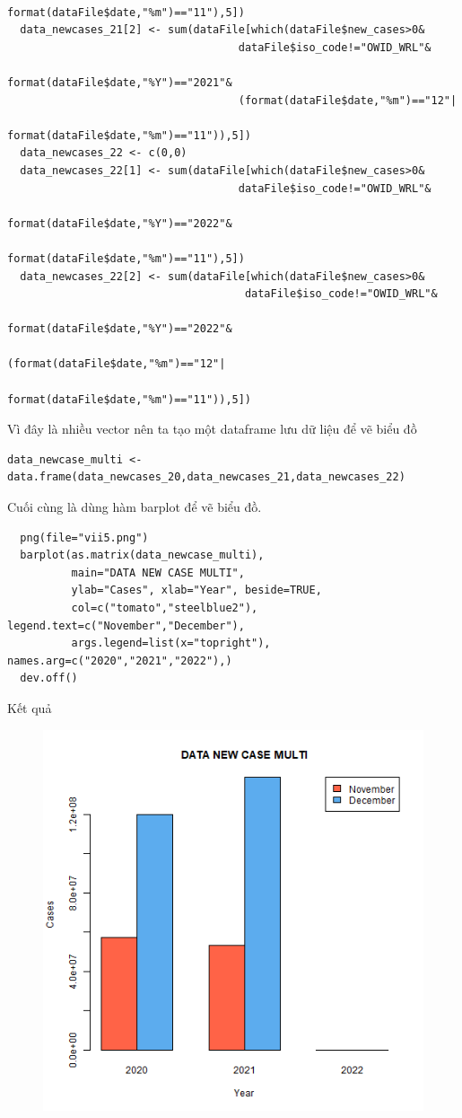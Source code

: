 \documentclass[a4paper]{article}
\theoremstyle{definition}
\begin{document}
\begin{enumerate}[1)]
\begin{lstlisting}
                                    format(dataFile$date,"%m")=="11"),5]) 
  data_newcases_21[2] <- sum(dataFile[which(dataFile$new_cases>0&
                                    dataFile$iso_code!="OWID_WRL"&
                                    format(dataFile$date,"%Y")=="2021"&
                                    (format(dataFile$date,"%m")=="12"|
                                    format(dataFile$date,"%m")=="11")),5]) 
  data_newcases_22 <- c(0,0)
  data_newcases_22[1] <- sum(dataFile[which(dataFile$new_cases>0&
                                    dataFile$iso_code!="OWID_WRL"&
                                    format(dataFile$date,"%Y")=="2022"&
                                    format(dataFile$date,"%m")=="11"),5]) 
  data_newcases_22[2] <- sum(dataFile[which(dataFile$new_cases>0&
                                     dataFile$iso_code!="OWID_WRL"&
                                     format(dataFile$date,"%Y")=="2022"&
                                     (format(dataFile$date,"%m")=="12"|
                                     format(dataFile$date,"%m")=="11")),5]) 
\end{lstlisting}
Vì đây là nhiều vector nên ta tạo một dataframe lưu dữ liệu để vẽ biểu đồ
\begin{lstlisting}
data_newcase_multi <- data.frame(data_newcases_20,data_newcases_21,data_newcases_22)
\end{lstlisting}
Cuối cùng là dùng hàm barplot để vẽ biểu đồ.
\begin{lstlisting}
  png(file="vii5.png")
  barplot(as.matrix(data_newcase_multi),
          main="DATA NEW CASE MULTI",
          ylab="Cases", xlab="Year", beside=TRUE,
          col=c("tomato","steelblue2"), legend.text=c("November","December"),
          args.legend=list(x="topright"), names.arg=c("2020","2021","2022"),)
  dev.off()
\end{lstlisting}
Kết quả
\begin{figure}[H]
        \begin{center}
            \includegraphics[scale=0.3]{vii/vii5.png} 

\end{center}
\end{figure}
\end{enumerate}
\end{document}
